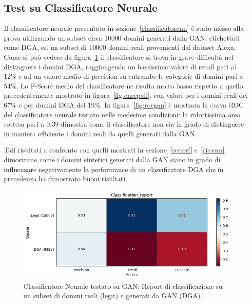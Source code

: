 \newpage
\subsection{Test su Classificatore Neurale}
Il classificatore neurale presentato in sezione~\ref{classificatorenn} è stato messo alla prova utilizzando un subset circa 10000 domini generati dalla GAN, etichettati come DGA, ed un subset di 10000 domini reali provenienti dal dataset Alexa. 
Come si può vedere da figura~\ref{fig:repgan} il classificatore si trova in grave difficoltà nel distinguere i domini DGA, raggiungendo un bassissimo valore di recall pari al 12\% e ad un valore medio di precision su entrambe le categorie di domini pari a 54\%. Lo F-Score medio del classificatore ne risulta molto basso rispetto a quello precedentemente mostrato in figura~\ref{fig:cnrepall}, con valori per i domini reali del 67\% e per domini DGA del 19\%.
In figura~\ref{fig:rocgan} è mostrata la curva ROC del classificatore neurale testato nelle medesime condizioni: la ridottissima area sottesa pari a 0.39 dimostra come il classificatore non sia in grado di distinguere in maniera efficiente i domini reali da quelli generati dalla GAN. 

Tali risultati a confronto con quelli mostrati in sezione~\ref{res:crf} e~\ref{ris:cnn} dimostrano come i domini sintetici generati dalla GAN siano in grado di influenzare negativamente la performance di un classificatore DGA che in precedenza ha dimostrato buoni risultati.

\begin{figure}[!bp]
    \centering
    \includegraphics[width=\columnwidth]{figures/gan/class_rep.png}
    \caption{Classificatore Neurale testato su GAN: Report di classificazione su un subset di domini reali (legit) e generati da GAN (DGA).\label{fig:repgan}}
\end{figure}


